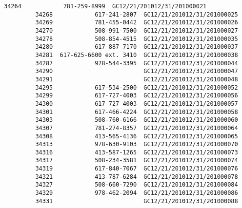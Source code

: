 \documentclass[11pt]{article}
\begin{document}
\begin{Verbatim}[commandchars=\\\{\}]
         34264            781-259-8999  GC12/21/201012/31/201000021   
         34268            617-241-2807  GC12/21/201012/31/201000025   
         34269            781-455-0442  GC12/21/201012/31/201000026   
         34270            508-991-7500  GC12/21/201012/31/201000027   
         34278            508-854-4515  GC12/21/201012/31/201000035   
         34280            617-887-7170  GC12/21/201012/31/201000037   
         34281  617-625-6600 ext. 3410  GC12/21/201012/31/201000038   
         34287            978-544-3395  GC12/21/201012/31/201000044   
         34290                          GC12/21/201012/31/201000047   
         34291                          GC12/21/201012/31/201000048   
         34295            617-534-2500  GC12/21/201012/31/201000052   
         34299            617-727-4003  GC12/21/201012/31/201000056   
         34300            617-727-4003  GC12/21/201012/31/201000057   
         34301            617-466-4224  GC12/21/201012/31/201000058   
         34303            508-760-6166  GC12/21/201012/31/201000060   
         34307            781-274-8357  GC12/21/201012/31/201000064   
         34308            413-565-4136  GC12/21/201012/31/201000065   
         34313            978-630-9103  GC12/21/201012/31/201000070   
         34316            413-587-1265  GC12/21/201012/31/201000073   
         34317            508-234-3581  GC12/21/201012/31/201000074   
         34319            617-840-7067  GC12/21/201012/31/201000076   
         34321            413-787-6284  GC12/21/201012/31/201000078   
         34327            508-660-7290  GC12/21/201012/31/201000084   
         34329            978-462-2094  GC12/21/201012/31/201000086   
         34331                          GC12/21/201012/31/201000088   
         

\end{Verbatim}
\end{document}
